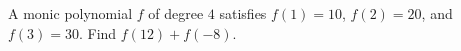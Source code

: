 A monic polynomial $f$ of degree $4$ satisfies $f(1)=10$, $f(2)=20$, and $f(3)=30$. Find $f(12)+f(-8)$.
